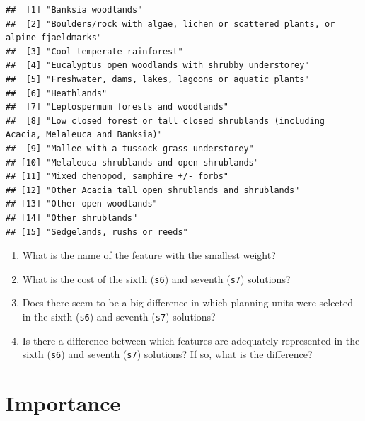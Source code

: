 \documentclass[
  12pt,
]{book}
\makeatletter
\providecommand{\tightlist}{%
  \setlength{\itemsep}{0pt}\setlength{\parskip}{0pt}}
\newenvironment{kframe}{%
\medskip{}
\setlength{\fboxsep}{.8em}
 \def\at@end@of@kframe{}%
 \ifinner\ifhmode%
  \def\at@end@of@kframe{\end{minipage}}%
  \begin{minipage}{\columnwidth}%
 \fi\fi%
 \def\FrameCommand##1{\hskip\@totalleftmargin \hskip-\fboxsep
 \colorbox{shadecolor}{##1}\hskip-\fboxsep
     \hskip-\linewidth \hskip-\@totalleftmargin \hskip\columnwidth}%
 \MakeFramed {\advance\hsize-\width
   \@totalleftmargin\z@ \linewidth\hsize
   \@setminipage}}%
 {\par\unskip\endMakeFramed%
 \at@end@of@kframe}
\newenvironment{rmdblock}[1]
  {
  \begin{itemize}
  \renewcommand{\labelitemi}{
    \raisebox{-.7\height}[0pt][0pt]{
      {\setkeys{Gin}{width=3em,keepaspectratio}\texttt{[image: images/\#1]}}
    }
  }
  \setlength{\fboxsep}{1em}
  \begin{kframe}
  \item
  }
  {
  \end{kframe}
  \end{itemize}
  }
\newenvironment{rmdquestion}
  {\begin{rmdblock}{question}}
  {\end{rmdblock}}
\makeatother
\begin{document}
\begin{verbatim}
##  [1] "Banksia woodlands"                                                                    
##  [2] "Boulders/rock with algae, lichen or scattered plants, or alpine fjaeldmarks"          
##  [3] "Cool temperate rainforest"                                                            
##  [4] "Eucalyptus open woodlands with shrubby understorey"                                   
##  [5] "Freshwater, dams, lakes, lagoons or aquatic plants"                                   
##  [6] "Heathlands"                                                                           
##  [7] "Leptospermum forests and woodlands"                                                   
##  [8] "Low closed forest or tall closed shrublands (including Acacia, Melaleuca and Banksia)"
##  [9] "Mallee with a tussock grass understorey"                                              
## [10] "Melaleuca shrublands and open shrublands"                                             
## [11] "Mixed chenopod, samphire +/- forbs"                                                   
## [12] "Other Acacia tall open shrublands and shrublands"                                     
## [13] "Other open woodlands"                                                                 
## [14] "Other shrublands"                                                                     
## [15] "Sedgelands, rushs or reeds"
\end{verbatim}

\begin{rmdquestion}
\begin{enumerate}
\def\labelenumi{\arabic{enumi}.}
\tightlist
\item
  What is the name of the feature with the smallest weight?
\item
  What is the cost of the sixth (\texttt{s6}) and seventh (\texttt{s7}) solutions?
\item
  Does there seem to be a big difference in which planning units were selected in the sixth (\texttt{s6}) and seventh (\texttt{s7}) solutions?
\item
  Is there a difference between which features are adequately represented in the sixth (\texttt{s6}) and seventh (\texttt{s7}) solutions? If so, what is the difference?
\end{enumerate}
\end{rmdquestion}

\hypertarget{importance}{%
\chapter{Importance}\label{importance}}
\end{document}

